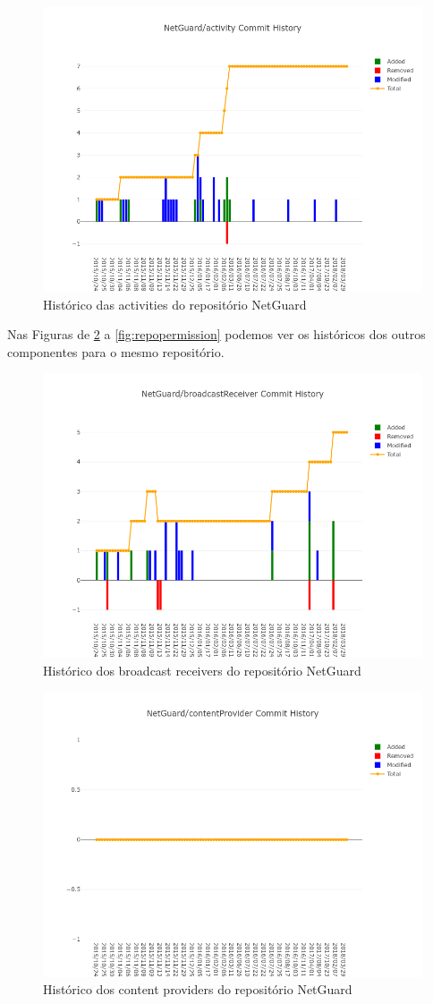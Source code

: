 \documentclass[a4paper,12pt]{article}
\begin{document}
{%
\begin{figure}[H]
\centering
\includegraphics[width=\linewidth,height=0.5\linewidth]{imgs/NetGuard_activity_history.png}
\caption{Histórico das activities do repositório NetGuard}
\label{fig:repoactivity}
\end{figure}


Nas Figuras de \ref{fig:repobroadcast} a \ref{fig:repopermission} podemos ver os históricos dos outros componentes para o mesmo repositório.

\begin{figure}[H]
\centering
\includegraphics[width=\linewidth,height=0.5\linewidth]{imgs/NetGuard_broadcastReceiver_history.png}
\caption{Histórico dos broadcast receivers do repositório NetGuard}
\label{fig:repobroadcast}
\end{figure}

\begin{figure}[H]
\centering
\includegraphics[width=\linewidth,height=0.5\linewidth]{imgs/NetGuard_contentProvider_history.png}
\caption{Histórico dos content providers do repositório NetGuard}
\label{fig:reporeceiver}
\end{figure}

}
\end{document}
